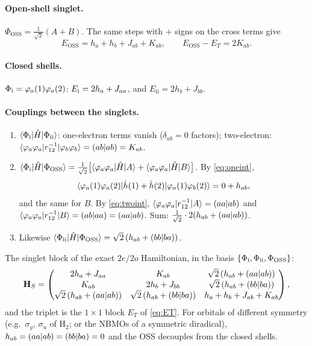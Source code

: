 \paragraph{Open-shell singlet.} $\Phi_{\text{OSS}}=\tfrac1{\sqrt2}(A+B)$. The same steps with $+$ signs
on the cross terms give
\begin{equation}\label{eq:EOSS}
  \boxed{E_{\text{OSS}}=h_a+h_b+J_{ab}+K_{ab}},\qquad E_{\text{OSS}}-E_T=2K_{ab}.
\end{equation}

\paragraph{Closed shells.} $\Phi_{\text i}=\varphi_a(1)\varphi_a(2)$: $E_{\text i}=2h_a+J_{aa}$, and
$E_{\text{ii}}=2h_b+J_{bb}$.

\paragraph{Couplings between the singlets.}
\begin{enumerate}
  \item $\langle \Phi_{\text i}\vert \hat H\vert \Phi_{\text{ii}}\rangle$: one-electron terms vanish ($\delta_{ab}=0$ factors);
        two-electron: $\langle \varphi_a\varphi_a\vert r_{12}^{-1}\vert \varphi_b\varphi_b\rangle=(ab\vert ab)=K_{ab}$.
  \item $\langle \Phi_{\text i}\vert \hat H\vert \Phi_{\text{OSS}}\rangle=\tfrac1{\sqrt2}\bigl[\langle \varphi_a\varphi_a\vert \hat H\vert A\rangle+\langle \varphi_a\varphi_a\vert \hat H\vert B\rangle\bigr]$.
        By \cref{eq:oneint},
        \[\langle \varphi_a(1)\varphi_a(2)\vert \hat h(1)+\hat h(2)\vert \varphi_a(1)\varphi_b(2)\rangle=0+h_{ab},\]
        and the same
        for $B$. By \cref{eq:twoint}, $\langle \varphi_a\varphi_a\vert r_{12}^{-1}\vert A\rangle=(aa\vert ab)$ and
        $\langle \varphi_a\varphi_a\vert r_{12}^{-1}\vert B\rangle=(ab\vert aa)=(aa\vert ab)$. Sum: $\tfrac1{\sqrt2}\cdot2(h_{ab}+(aa\vert ab))$.
  \item Likewise $\langle \Phi_{\text{ii}}\vert \hat H\vert \Phi_{\text{OSS}}\rangle=\sqrt2\,(h_{ab}+(bb\vert ba))$.
\end{enumerate}

\begin{resultbox}
The singlet block of the exact $2e/2o$ Hamiltonian, in the basis $\{\Phi_{\text i},\Phi_{\text{ii}},\Phi_{\text{OSS}}\}$:
\begin{equation}\label{eq:Hsinglet}
\mathbf H_S=\begin{pmatrix}
2h_a+J_{aa} & K_{ab} & \sqrt2\,(h_{ab}+(aa\vert ab))\\
K_{ab} & 2h_b+J_{bb} & \sqrt2\,(h_{ab}+(bb\vert ba))\\
\sqrt2\,(h_{ab}+(aa\vert ab)) & \sqrt2\,(h_{ab}+(bb\vert ba)) & h_a+h_b+J_{ab}+K_{ab}
\end{pmatrix},
\end{equation}
and the triplet is the $1\times1$ block $E_T$ of \cref{eq:ET}. For orbitals of different symmetry
(e.g.\ $\sigma_g$, $\sigma_u$ of H$_2$; or the NBMOs of a symmetric diradical),
$h_{ab}=(aa\vert ab)=(bb\vert ba)=0$ and the OSS decouples from the closed shells.
\end{resultbox}

